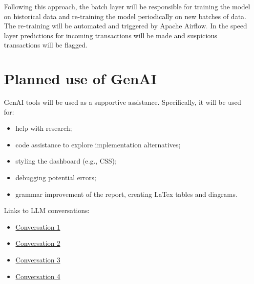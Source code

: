 \documentclass[titlepage]{article}
\begin{document}
Following this approach, the batch layer will be responsible for training the model on historical data and re-training the model periodically on new batches of data. The re-training will be automated and triggered by Apache Airflow.
In the speed layer predictions for incoming transactions will be made and suspicious transactions will be flagged. 

\section{Planned use of GenAI}
GenAI tools will be used as a supportive assistance. Specifically, it will be used for:
\begin{itemize}
    \item help with research;
    \item code assistance to explore implementation alternatives;
    \item styling the dashboard (e.g., CSS);
    \item debugging potential errors;
    \item grammar improvement of the report, creating LaTex tables and diagrams.
\end{itemize}

Links to LLM conversations:
\begin{itemize}
    \item \href{https://chatgpt.com/share/6af975cb-3cb0-83eb-9d00-6415159ec66b}{Conversation 1}
    \item \href{https://chatgpt.com/share/6b030060-cb88-83ed-bb4f-f7726704a61b}{Conversation 2}
    \item \href{https://share.gemini.google/Gyx7zNGD21rM}{Conversation 3}
    \item \href{https://claude.ai/share/58832e26-37f8-44c1-944e-3b1c76014795}{Conversation 4}
\end{itemize} 

\newpage
\listoffigures
\thispagestyle{empty}

\renewcommand{\listtablename}{List of tables}
\listoftables
\thispagestyle{empty}
\end{document}
